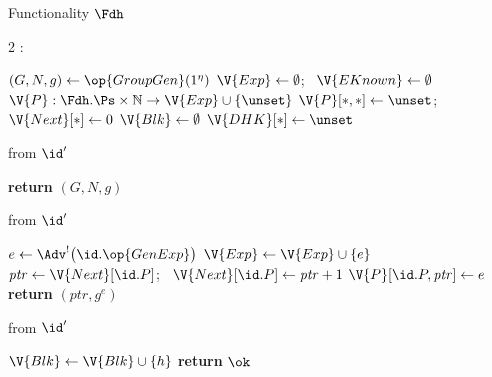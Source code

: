 \begin{interface}[nofloat]{Functionality $\Fdh$ \\
}

{\scriptsize
\setlength{\columnsep}{1.4em}
\begin{multicols}{2}
:
\begin{algorithmic}[1]
\setcounter{contline}{0}\algcont
\State $(G, N, g) \gets \op{GroupGen}(1^{\eta})$ \label{ln:dhgroup}
\State $\V{Exp} \gets \emptyset$; \ $\V{EKnown} \gets \emptyset$
\State $\V{P} : \Fdh.\Ps \times \mathbb{N} \to \V{Exp} \cup \{\unset\}$
\State $\V{P}[*,*] \gets \unset$; \ $\V{Next}[*] \gets 0$
\State $\V{Blk} \gets \emptyset$
\State $\V{DHK}[*] \gets \unset$
\algsave
\end{algorithmic}
\vspace{1.4ex}

 \quad from $\id'$
\begin{algorithmic}[1]
\algcont
\State \textbf{return} $(G, N, g)$
\algsave
\end{algorithmic}
\vspace{1.4ex}

 \quad from $\id'$
\begin{algorithmic}[1]
\algcont
\State $e \gets \Adv^{!}\bigl(\id.\op{GenExp}\bigr)$ \label{ln:dhaskexp}
 \label{ln:dhfresh}
\State $\V{Exp} \gets \V{Exp} \cup \{e\}$
\State $\mathit{ptr} \gets \V{Next}[\id.P]$; \ $\V{Next}[\id.P] \gets \mathit{ptr} + 1$
\State $\V{P}[\id.P, \mathit{ptr}] \gets e$
\State \textbf{return} $(\mathit{ptr}, g^{e})$ \label{ln:dhshare}
\algsave
\end{algorithmic}
\vspace{1.4ex}

 \quad from $\id'$
\begin{algorithmic}[1]
\algcont
{}
  \State $\V{Blk} \gets \V{Blk} \cup \{h\}$ \label{ln:dhblock}
\EndIf
\State \textbf{return} $\ok$
\algsave
\end{algorithmic}
\vspace{1.4ex}


\end{multicols}}
\end{interface}
